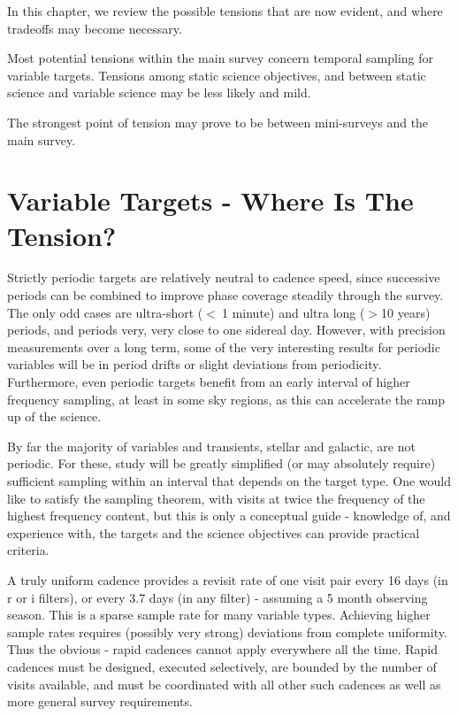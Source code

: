 In this chapter, we review the possible tensions that are now evident,
and where tradeoffs may become necessary.

Most potential tensions within the main survey concern temporal sampling
for variable targets.  Tensions among static science objectives, and
between static science and variable science may be less likely and mild.

The strongest point of tension may prove to be between mini-surveys and
the main survey.



\section{Variable Targets - Where Is The Tension?}

Strictly periodic targets are relatively neutral to cadence speed, since
successive periods can be combined to improve phase coverage steadily
through the survey.  The only odd cases are ultra-short ($<~ $1 minute)
and ultra long ($> $10 years) periods, and periods very, very close to
one sidereal day.  However, with precision measurements over a long
term, some of the very interesting results for periodic variables will
be in period drifts or slight deviations from periodicity. Furthermore,
even periodic targets benefit from an early interval of higher frequency
sampling, at least in some sky regions, as this can accelerate the ramp
up of the science.

By far the majority of variables and transients, stellar and galactic,
are not periodic. For these, study will be greatly simplified (or may
absolutely require) sufficient sampling within an interval that depends
on the target type. One would like to satisfy the sampling theorem, with
visits at twice the frequency of the highest frequency content, but this
is only a conceptual guide - knowledge of, and experience with, the
targets and the science objectives can provide practical criteria.

A truly uniform cadence provides a revisit rate of one visit pair every
16 days (in r or i filters), or every 3.7 days (in any filter) -
assuming a 5 month observing season.  This is a sparse sample rate for
many variable types.  Achieving higher sample rates requires (possibly
very strong) deviations from complete uniformity.  Thus the obvious -
rapid cadences cannot apply everywhere all the time. Rapid cadences must
be designed, executed selectively, are bounded by the number of visits
available, and must be coordinated with all other such cadences as well
as more general survey requirements.

